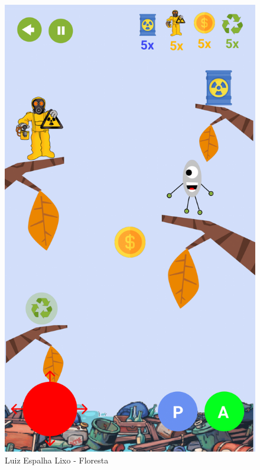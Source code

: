 \documentclass[]{scrartcl}
\begin{document}
\begin{figure}[H]
	\begin{center}
		\includegraphics[scale=0.3]{figs/Game Design-17.png}
		\caption{Luiz Espalha Lixo - Floresta}
	\end{center}
\end{figure}
\end{document}
